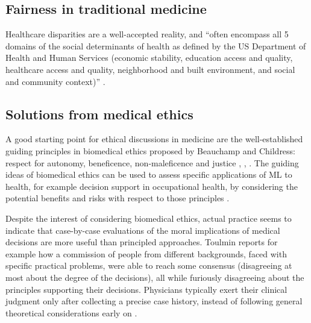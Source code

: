 \subsection{Fairness in traditional medicine}
    Healthcare disparities are a well-accepted reality, and ``often encompass all 5 domains of the social determinants of health as defined by the US Department of Health and Human Services (economic stability, education access and quality, healthcare access and quality, neighborhood and built environment, and social and community context)'' \cite[p.~2]{Chen2021}.


\subsection{Solutions from medical ethics}
    A good starting point for ethical discussions in medicine are the well-established guiding principles in biomedical ethics proposed by Beauchamp and Childress: respect for autonomy, beneficence, non-maleficence and justice \cite[pp.~344-345]{Dijkstra2020}, \cite[p.~2]{Morley2020}, \cite[p.~2]{Rajkomar2018}.
    The guiding ideas of biomedical ethics can be used to assess specific applications of ML to health, for example decision support in occupational health, by considering the potential benefits and risks with respect to those principles \cite{Dijkstra2020}.

    Despite the interest of considering biomedical ethics, actual practice seems to indicate that case-by-case evaluations of the moral implications of medical decisions are more useful than principled approaches.
    Toulmin\cite{Toulmin1982} reports for example how a commission of people from different backgrounds, faced with specific practical problems, were able to reach some consensus (disagreeing at most about the degree of the decisions), all while furiously disagreeing about the principles supporting their decisions.
    Physicians typically exert their clinical judgment only after collecting a precise case history, instead of following general theoretical considerations early on \cite{Toulmin1982}.
